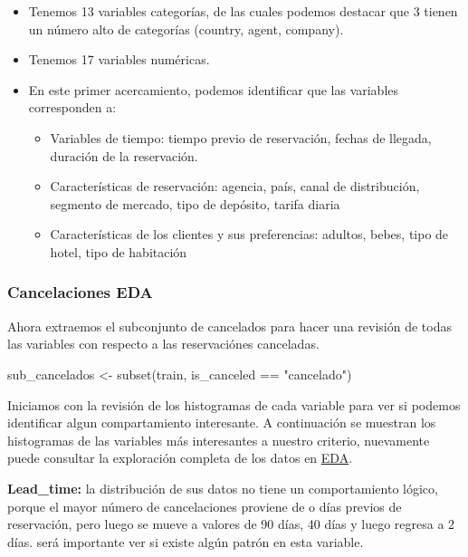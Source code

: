 \documentclass[
]{article}
\newenvironment{Shaded}{\begin{snugshade}}{\end{snugshade}}
\newcommand{\FunctionTok}[1]{\textcolor[rgb]{0.00,0.00,0.00}{#1}}
\newcommand{\NormalTok}[1]{#1}
\newcommand{\OtherTok}[1]{\textcolor[rgb]{0.56,0.35,0.01}{#1}}
\newcommand{\SpecialCharTok}[1]{\textcolor[rgb]{0.00,0.00,0.00}{#1}}
\newcommand{\StringTok}[1]{\textcolor[rgb]{0.31,0.60,0.02}{#1}}
\begin{document}
\begin{itemize}
\item
  Tenemos 13 variables categorías, de las cuales podemos destacar que 3
  tienen un número alto de categorías (country, agent, company).
\item
  Tenemos 17 variables numéricas.
\item
  En este primer acercamiento, podemos identificar que las variables
  corresponden a:

  \begin{itemize}
  \item
    Variables de tiempo: tiempo previo de reservación, fechas de
    llegada, duración de la reservación.
  \item
    Características de reservación: agencia, país, canal de
    distribución, segmento de mercado, tipo de depósito, tarifa diaria
  \item
    Características de los clientes y sus preferencias: adultos, bebes,
    tipo de hotel, tipo de habitación
  \end{itemize}
\end{itemize}

\hypertarget{cancelaciones-eda}{%
\subsubsection{Cancelaciones EDA}\label{cancelaciones-eda}}

Ahora extraemos el subconjunto de cancelados para hacer una revisión de
todas las variables con respecto a las reservaciónes canceladas.

\begin{Shaded}
\begin{Highlighting}[]
\NormalTok{sub\_cancelados }\OtherTok{\textless{}{-}} \FunctionTok{subset}\NormalTok{(train, is\_canceled }\SpecialCharTok{==} \StringTok{"cancelado"}\NormalTok{)}
\end{Highlighting}
\end{Shaded}

Iniciamos con la revisión de los histogramas de cada variable para ver
si podemos identificar algun compartamiento interesante. A continuación
se muestran los histogramas de las variables más interesantes a nuestro
criterio, nuevamente puede consultar la exploración completa de los
datos en
\href{https://github.com/marcoyel21/hotel_cancelation_ML21/blob/main/final/EDA_Cancelaciones.Rmd}{EDA}.

\textbf{Lead\_time:} la distribución de sus datos no tiene un
comportamiento lógico, porque el mayor número de cancelaciones proviene
de o días previos de reservación, pero luego se mueve a valores de 90
días, 40 días y luego regresa a 2 días. será importante ver si existe
algún patrón en esta variable.
\end{document}
